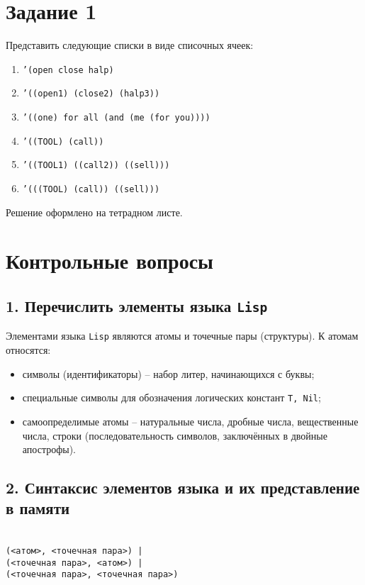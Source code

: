 \section*{Задание 1}

Представить следующие списки в виде списочных ячеек:
\begin{enumerate}
	\item {\texttt{'(open close halp)}}
	\item {\texttt{'((open1) (close2) (halp3))}}
	\item {\texttt{'((one) for all (and (me (for you))))}}
	\item {\texttt{'((TOOL) (call))}}
	\item {\texttt{'((TOOL1) ((call2)) ((sell)))}}
	\item {\texttt{'(((TOOL) (call)) ((sell)))}}
\end{enumerate}

Решение оформлено на тетрадном листе.

\section*{Контрольные вопросы}

\subsection*{1. Перечислить элементы языка {\texttt{Lisp}}}

Элементами языка {\texttt{Lisp}} являются атомы и точечные пары (структуры). К атомам относятся:
\begin{itemize}
	\item символы (идентификаторы) -- набор литер, начинающихся с буквы;
	\item специальные символы для обозначения логических констант {\texttt{T,~Nil}};
	\item самоопределимые атомы -- натуральные числа, дробные числа, вещественные числа, строки (последовательность символов, заключённых в двойные апострофы).
\end{itemize}

\subsection*{2. Синтаксис элементов языка и их представление в памяти}

\\
{\texttt{(<атом>, <точечная пара>) |}}\\
{\texttt{(<точечная пара>, <атом>) |}}\\
{\texttt{(<точечная пара>, <точечная пара>)}}\\

